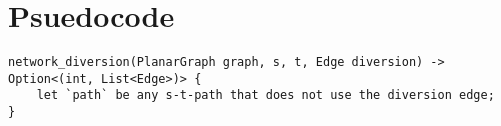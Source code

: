 \section{Psuedocode}
\begin{lstlisting}[caption={Main},label=Listing,mathescape=true]
network_diversion(PlanarGraph graph, s, t, Edge diversion) -> Option<(int, List<Edge>)> {
    let `path` be any s-t-path that does not use the diversion edge;
}
\end{lstlisting}